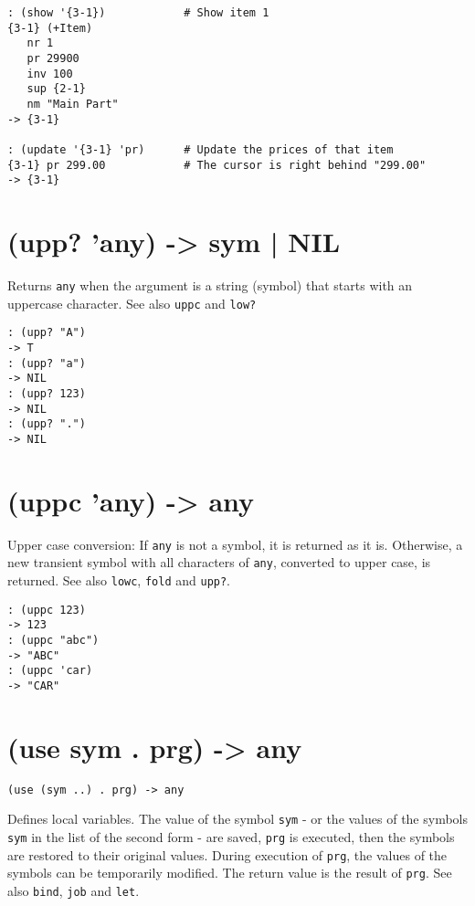 {{{{{{{{\begin{verbatim}
: (show '{3-1})            # Show item 1
{3-1} (+Item)
   nr 1
   pr 29900
   inv 100
   sup {2-1}
   nm "Main Part"
-> {3-1}

: (update '{3-1} 'pr)      # Update the prices of that item
{3-1} pr 299.00            # The cursor is right behind "299.00"
-> {3-1}
\end{verbatim}

 
\section{(upp? 'any) -> sym | NIL}
\label{sec-8-1-21-17}


Returns \texttt{any} when the argument is a string (symbol) that starts with an
uppercase character. See also \texttt{uppc} and \texttt{low?}


\begin{verbatim}
: (upp? "A")
-> T
: (upp? "a")
-> NIL
: (upp? 123)
-> NIL
: (upp? ".")
-> NIL
\end{verbatim}

 
\section{(uppc 'any) -> any}
\label{sec-8-1-21-18}


Upper case conversion: If \texttt{any} is not a symbol, it is returned as it
is. Otherwise, a new transient symbol with all characters of \texttt{any},
converted to upper case, is returned. See also \texttt{lowc}, \texttt{fold} and
\texttt{upp?}.


\begin{verbatim}
: (uppc 123)
-> 123
: (uppc "abc")
-> "ABC"
: (uppc 'car)
-> "CAR"
\end{verbatim}

 
\section{(use sym . prg) -> any}
\label{sec-8-1-21-19}


\texttt{(use (sym ..) . prg) -> any}

Defines local variables. The value of the symbol \texttt{sym} - or the values
of the symbols \texttt{sym} in the list of the second form - are saved, \texttt{prg}
is executed, then the symbols are restored to their original values.
During execution of \texttt{prg}, the values of the symbols can be temporarily
modified. The return value is the result of \texttt{prg}. See also \texttt{bind},
\texttt{job} and \texttt{let}.


}}}}}}}}
